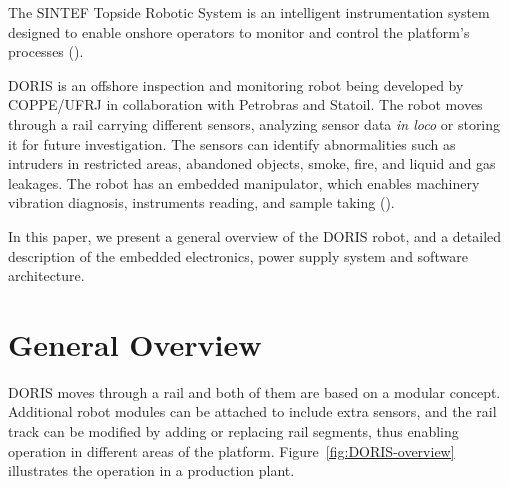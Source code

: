 \documentclass{ifacconf}
\begin{document}

The SINTEF Topside Robotic System is an intelligent instrumentation system
designed to enable onshore operators to monitor and control the platform's
processes (\cite{kyrkjebo2009robotic}).

DORIS is an offshore inspection and monitoring robot being developed by
COPPE/UFRJ in collaboration with Petrobras and Statoil. The robot moves through
a rail carrying different sensors, analyzing sensor data \emph{in loco} or
storing it for future investigation. The sensors can identify abnormalities
such as intruders in restricted areas, abandoned objects, smoke, fire, and
liquid and gas leakages. The robot has an embedded manipulator, which enables
machinery vibration diagnosis, instruments reading, and sample taking
(\cite{cba}).

In this paper, we present a general overview of the DORIS robot, and a detailed
description of the embedded electronics, power supply system and software architecture.

\section{General Overview}\label{sec:general_overview}

DORIS moves through a rail and both of them are based on a modular concept.
Additional robot modules can be attached to include extra sensors, and the rail
track can be modified by adding or replacing rail segments, thus enabling
operation in different areas of the platform. Figure~\ref{fig:DORIS-overview}
illustrates the operation in a production plant.
\end{document}
